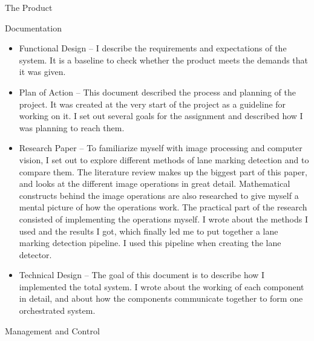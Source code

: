 \documentclass{matthijs}
\begin{document}
\begin{hoofdstuk}{The Product}
\begin{paragraaf}{Documentation}
\begin{itemize}
				\item Functional Design --
					I describe the requirements and expectations of the system.
					It is a baseline to check whether the product meets the demands that it was given.

				\item Plan of Action --
					This document described the process and planning of the project.
					It was created at the very start of the project as a guideline for working on it.
					I set out several goals for the assignment and described how I was planning to reach them.

				\item Research Paper --
					To familiarize myself with image processing and computer vision, I set out to explore different methods of lane marking detection and to compare them.
					The literature review makes up the biggest part of this paper, and looks at the different image operations in great detail.
					Mathematical constructs behind the image operations are also researched to give myself a mental picture of how the operations work.
					The practical part of the research consisted of implementing the operations myself.
					I wrote about the methods I used and the results I got, which finally led me to put together a lane marking detection pipeline.
					I used this pipeline when creating the lane detector.

				\item Technical Design --
					The goal of this document is to describe how I implemented the total system.
					I wrote about the working of each component in detail, and about how the components communicate together to form one orchestrated system.

			\end{itemize}

		\end{paragraaf}

	\end{hoofdstuk}
	
	\begin{hoofdstuk}{Management and Control}

	\end{hoofdstuk}
	
\end{document}
